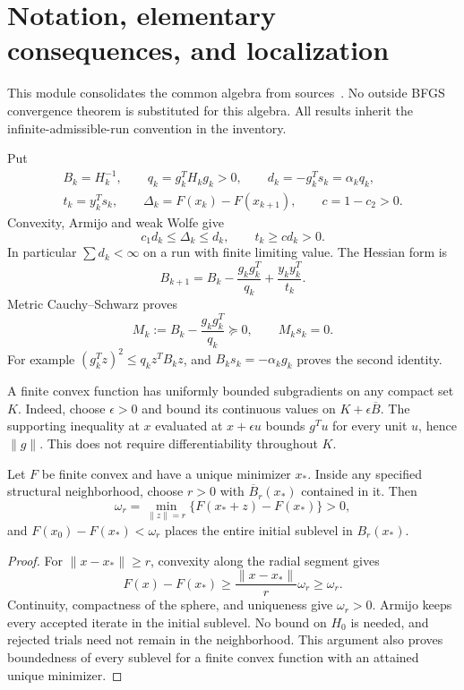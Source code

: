 \section{Notation, elementary consequences, and localization}
\label{M:notation}
This module consolidates the common algebra from sources~\cite{SM,SH,SQ,SU}. No outside BFGS convergence theorem is substituted for this algebra. All results inherit the infinite-admissible-run convention in the inventory.

Put
\[
 \begin{gathered}
 B_k=H_k^{-1},\qquad q_k=g_k^TH_kg_k>0,\qquad d_k=-g_k^Ts_k=\alpha_kq_k,\\
 t_k=y_k^Ts_k,\qquad\Delta_k=F(x_k)-F(x_{k+1}),\qquad c=1-c_2>0.
 \end{gathered}
\]
Convexity, Armijo and weak Wolfe give
\begin{equation}\label{M:basic}
 c_1d_k\le\Delta_k\le d_k,\qquad t_k\ge c d_k>0.
\end{equation}
In particular $\sum d_k<\infty$ on a run with finite limiting value. The Hessian form is
\begin{equation}\label{M:hessian}
 B_{k+1}=B_k-\frac{g_kg_k^T}{q_k}+\frac{y_ky_k^T}{t_k}.
\end{equation}
Metric Cauchy--Schwarz proves
\begin{equation}\label{M:annihilation}
 M_k:=B_k-\frac{g_kg_k^T}{q_k}\succeq0,\qquad M_ks_k=0.
\end{equation}
For example $(g_k^Tz)^2\le q_k z^TB_kz$, and $B_ks_k=-\alpha_kg_k$ proves the second identity.

A finite convex function has uniformly bounded subgradients on any compact set $K$. Indeed, choose $\epsilon>0$ and bound its continuous values on $K+\epsilon\overline B$. The supporting inequality at $x$ evaluated at $x+\epsilon u$ bounds $g^Tu$ for every unit $u$, hence $\|g\|$. This does not require differentiability throughout $K$.

\begin{lemma}\label{M:localization}
Let $F$ be finite convex and have a unique minimizer $x_*$. Inside any specified structural neighborhood, choose $r>0$ with $\overline B_r(x_*)$ contained in it. Then
\[
 \omega_r=\min_{\|z\|=r}\{F(x_*+z)-F(x_*)\}>0,
\]
and $F(x_0)-F(x_*)<\omega_r$ places the entire initial sublevel in $B_r(x_*)$.
\end{lemma}
\begin{proof}
For $\|x-x_*\|\ge r$, convexity along the radial segment gives
\[
 F(x)-F(x_*)\ge\frac{\|x-x_*\|}{r}\omega_r\ge\omega_r.
\]
Continuity, compactness of the sphere, and uniqueness give $\omega_r>0$. Armijo keeps every accepted iterate in the initial sublevel. No bound on $H_0$ is needed, and rejected trials need not remain in the neighborhood. This argument also proves boundedness of every sublevel for a finite convex function with an attained unique minimizer.
\end{proof}

